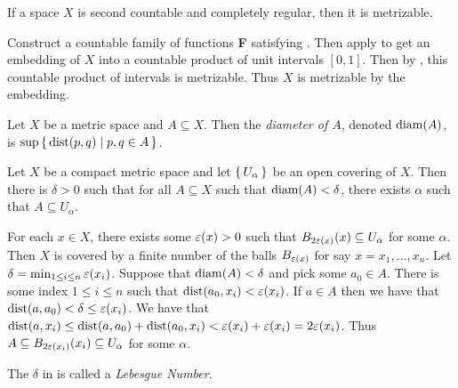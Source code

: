 \documentclass[letterpaper, 11pt, oneside]{book}
\begin{document}
\begin{thrm}\label{thrm: urysohn_metrization}
  If a space $X$ is second countable and completely regular, then it is metrizable.
\end{thrm}
\begin{pf}
  Construct a countable family of functions \textbf{F} satisfying .
  Then apply  to get an embedding of $X$ into a countable product of unit intervals $[0, 1]$.
  Then by , this countable product of intervals is metrizable.
  Thus $X$ is metrizable by the embedding.
\end{pf}

\begin{defn}
  Let $X$ be a metric space and $A \subseteq X$. Then the \emph{diameter of $A$}, denoted $\operatorname{diam}(A)$, is $\sup\set{\operatorname{dist}(p, q) | p, q \in A}$.
\end{defn}

\begin{lem}\label{lem: lebesgue_lemma}
  Let $X$ be a compact metric space and let $\set{U_{\alpha}}$ be an open covering of $X$.
  Then there is $\delta > 0$ such that for all $A \subseteq X$ such that $\operatorname{diam}(A) < \delta$, there exists $\alpha$ such that $A \subseteq U_{\alpha}$.
\end{lem}
\begin{pf}
  For each $x \in X$, there exists some $\varepsilon(x) > 0$ such that $B_{2\varepsilon(x)}(x) \subseteq U_{\alpha}$ for some $\alpha$.
  Then $X$ is covered by a finite number of the balls $B_{\varepsilon(x)}$ for say $x = x_{1}, \ldots, x_{n}$.
  Let $\delta = \min_{1 \leq i \leq n} \varepsilon(x_{i})$.
  Suppose that $\operatorname{diam}(A) < \delta$ and pick some $a_{0} \in A$.
  There is some index $1 \leq i \leq n$ such that $\operatorname{dist}(a_{0}, x_{i}) < \varepsilon(x_{i})$.
  If $a \in A$ then we have that $\operatorname{dist}(a, a_{0}) < \delta \leq \varepsilon(x_{i})$.
  We have that $\operatorname{dist}(a, x_{i}) \leq \operatorname{dist}(a, a_{0}) + \operatorname{dist}(a_{0}, x_{i}) < \varepsilon(x_{i}) + \varepsilon(x_{i}) = 2\varepsilon(x_{i})$.
  Thus $A \subseteq B_{2\varepsilon(x_{i})}(x_{i}) \subseteq U_{\alpha}$ for some $\alpha$.
\end{pf}

\begin{defn}
  The $\delta$ in  is called a \emph{Lebesgue Number}.
\end{defn}

\clearpage
\end{document}
